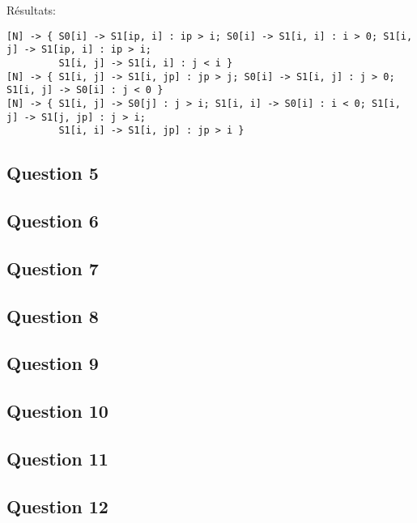 \documentclass{article}
\begin{document}
Résultats:
\begin{lstlisting}
[N] -> { S0[i] -> S1[ip, i] : ip > i; S0[i] -> S1[i, i] : i > 0; S1[i, j] -> S1[ip, i] : ip > i;
         S1[i, j] -> S1[i, i] : j < i }
[N] -> { S1[i, j] -> S1[i, jp] : jp > j; S0[i] -> S1[i, j] : j > 0; S1[i, j] -> S0[i] : j < 0 }
[N] -> { S1[i, j] -> S0[j] : j > i; S1[i, i] -> S0[i] : i < 0; S1[i, j] -> S1[j, jp] : j > i;
         S1[i, i] -> S1[i, jp] : jp > i }
\end{lstlisting}

\subsection*{Question 5}

\subsection*{Question 6}

\subsection*{Question 7}

\subsection*{Question 8}

\subsection*{Question 9}

\subsection*{Question 10}

\subsection*{Question 11}

\subsection*{Question 12}
\end{document}
